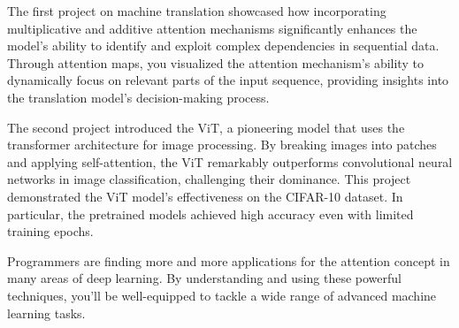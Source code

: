 The first project on machine translation showcased how incorporating multiplicative and additive attention mechanisms significantly enhances the model's ability to identify and exploit complex dependencies in sequential data. Through attention maps, you visualized the attention mechanism's ability to dynamically focus on relevant parts of the input sequence, providing insights into the translation model's decision-making process.

The second project introduced the ViT, a pioneering model that uses the transformer architecture for image processing. By breaking images into patches and applying self-attention, the ViT remarkably outperforms convolutional neural networks in image classification, challenging their dominance. This project demonstrated the ViT model's effectiveness on the CIFAR-10 dataset.  In particular, the pretrained models achieved high accuracy even with limited training epochs.

Programmers are finding more and more applications for the attention concept in many areas of deep learning. By understanding and using these powerful techniques, you'll be well-equipped to tackle a wide range of advanced machine learning tasks.

